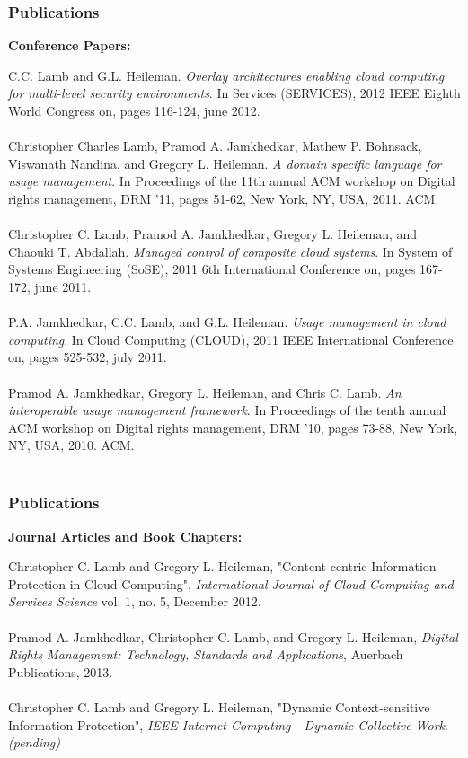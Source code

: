 \documentclass[t,handout]{beamer}
\begin{document}
\begin{frame}
\frametitle{Publications}
{\bf Conference Papers:} \\
\begin{scriptsize}
C.C. Lamb and G.L. Heileman. {\sl Overlay architectures enabling cloud computing for multi-level security environments}. In Services (SERVICES), 2012 IEEE Eighth World Congress on, pages 116-124, june 2012.\\
~\\
Christopher Charles Lamb, Pramod A. Jamkhedkar, Mathew P. Bohnsack, Viswanath Nandina, and Gregory L. Heileman. {\sl A domain specific language for usage management}. In Proceedings of the 11th annual ACM workshop on Digital rights management, DRM '11, pages 51-62, New York, NY, USA, 2011. ACM. \\
~\\
Christopher C. Lamb, Pramod A. Jamkhedkar, Gregory L. Heileman, and Chaouki T. Abdallah. {\sl Managed control of composite cloud systems}. In System of Systems Engineering (SoSE), 2011 6th International Conference on, pages 167-172, june 2011. \\
~\\
P.A. Jamkhedkar, C.C. Lamb, and G.L. Heileman. {\sl Usage management in cloud computing}. In Cloud Computing (CLOUD), 2011 IEEE International Conference on, pages 525-532, july 2011. \\
~\\
Pramod A. Jamkhedkar, Gregory L. Heileman, and Chris C. Lamb. {\sl An interoperable usage management framework}. In Proceedings of the tenth annual ACM workshop on Digital rights management, DRM '10, pages 73-88, New York, NY, USA, 2010. ACM. \\
~\\
\end{scriptsize}
\end{frame}

\begin{frame}
\frametitle{Publications}
{\bf Journal Articles and Book Chapters:} \\
\begin{scriptsize}
Christopher C. Lamb and Gregory L. Heileman, "Content-centric Information Protection in Cloud Computing", {\it International Journal of Cloud Computing and Services Science} vol. 1, no. 5, December 2012. \\
~\\
Pramod A. Jamkhedkar, Christopher C. Lamb, and Gregory L. Heileman, {\it Digital Rights Management: Technology, Standards and Applications}, Auerbach Publications, 2013. \\
~\\
Christopher C. Lamb and Gregory L. Heileman, "Dynamic Context-sensitive Information Protection", {\it IEEE Internet Computing - Dynamic Collective Work}. {\it (pending) }\\
~\\
\end{scriptsize}
\end{frame}
\end{document}
